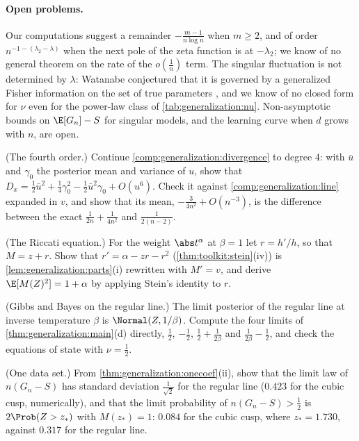 \begin{refsection}
\paragraph{Open problems.} Our computations suggest a remainder $-\frac{m-1}{n\log n}$ when $m\ge2$, and of order $n^{-1-(\lambda_2-\lambda)}$ when the next pole of the zeta function is at $-\lambda_2$; we know of no general theorem on the rate of the $o(\frac1n)$ term. The singular fluctuation is not determined by $\lambda$: Watanabe conjectured that it is governed by a generalized Fisher information on the set of true parameters \parencite[\S5]{Watanabe2010a}, and we know of no closed form for $\nu$ even for the power-law class of \cref{tab:generalization:nu}. Non-asymptotic bounds on $\E[G_n]-S$ for singular models, and the learning curve when $d$ grows with $n$, are open.

\begin{exercises}
\item \consolidation (The fourth order.) Continue \cref{comp:generalization:divergence} to degree $4$: with $\bar u$ and $\gamma_0$ the posterior mean and variance of $u$, show that $D_x=\frac12\bar u^2+\frac14\gamma_0^2-\frac12\bar u^2\gamma_0+O(u^6)$. Check it against \cref{comp:generalization:line} expanded in $v$, and show that its mean, $-\frac3{4n^2}+O(n^{-3})$, is the difference between the exact $\frac1{2n}+\frac1{4n^2}$ and $\frac1{2(n-2)}$. \label{ex:generalization:fourth}

\item \consolidation (The Riccati equation.) For the weight $\abs t^\alpha$ at $\beta=1$ let $r=h'/h$, so that $M=z+r$. Show that $r'=\alpha-zr-r^2$ (\cref{thm:toolkit:stein}(iv)) is \cref{lem:generalization:parts}(i) rewritten with $M'=v$, and derive $\E[M(Z)^2]=1+\alpha$ by applying Stein's identity to $r$.\label{ex:generalization:riccati}

\item \consolidation (Gibbs and Bayes on the regular line.) The limit posterior of the regular line at inverse temperature $\beta$ is $\Normal(Z,1/\beta)$. Compute the four limits of \cref{thm:generalization:main}(d) directly, $\frac12$, $-\frac12$, $\frac12+\frac1{2\beta}$ and $\frac1{2\beta}-\frac12$, and check the equations of state with $\nu=\frac12$.\label{ex:generalization:regular}

\item \consolidation (One data set.) From \cref{thm:generalization:onecoef}(ii), show that the limit law of $n(G_n-S)$ has standard deviation $\frac1{\sqrt2}$ for the regular line ($0.423$ for the cubic cusp, numerically), and that the limit probability of $n(G_n-S)>\frac12$ is $2\Prob(Z>z_*)$ with $M(z_*)=1$: $0.084$ for the cubic cusp, where $z_*=1.730$, against $0.317$ for the regular line.\label{ex:generalization:law}


\end{exercises}
\end{refsection}
